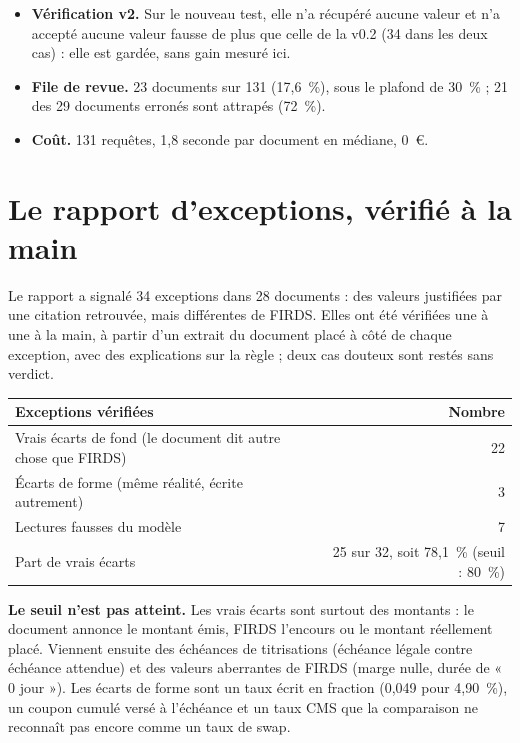 \documentclass[11pt,a4paper]{article}
\begin{document}
\begin{itemize}
  \item \textbf{Vérification v2.} Sur le nouveau test, elle n'a récupéré aucune valeur et n'a accepté aucune valeur fausse de plus que celle de la v0.2 (34 dans les deux cas) : elle est gardée, sans gain mesuré ici.
  \item \textbf{File de revue.} 23 documents sur 131 (17,6~\%), sous le plafond de 30~\% ; 21 des 29 documents erronés sont attrapés (72~\%).
  \item \textbf{Coût.} 131 requêtes, 1,8 seconde par document en médiane, 0~€.
\end{itemize}

\section{Le rapport d'exceptions, vérifié à la main}

Le rapport a signalé 34 exceptions dans 28 documents : des valeurs justifiées par une citation retrouvée, mais différentes de FIRDS. Elles ont été vérifiées une à une à la main, à partir d'un extrait du document placé à côté de chaque exception, avec des explications sur la règle ; deux cas douteux sont restés sans verdict.

\begin{table}[H]
\small
\begin{tabularx}{\linewidth}{Yr}
\toprule
\textbf{Exceptions vérifiées} & \textbf{Nombre} \\
\midrule
Vrais écarts de fond (le document dit autre chose que FIRDS) & 22 \\
Écarts de forme (même réalité, écrite autrement) & 3 \\
Lectures fausses du modèle & 7 \\
\midrule
Part de vrais écarts & 25 sur 32, soit 78,1~\% (seuil : 80~\%) \\
\bottomrule
\end{tabularx}
\end{table}

\textbf{Le seuil n'est pas atteint.} Les vrais écarts sont surtout des montants : le document annonce le montant émis, FIRDS l'encours ou le montant réellement placé. Viennent ensuite des échéances de titrisations (échéance légale contre échéance attendue) et des valeurs aberrantes de FIRDS (marge nulle, durée de « 0 jour »). Les écarts de forme sont un taux écrit en fraction (0,049 pour 4,90~\%), un coupon cumulé versé à l'échéance et un taux CMS que la comparaison ne reconnaît pas encore comme un taux de swap.
\end{document}
